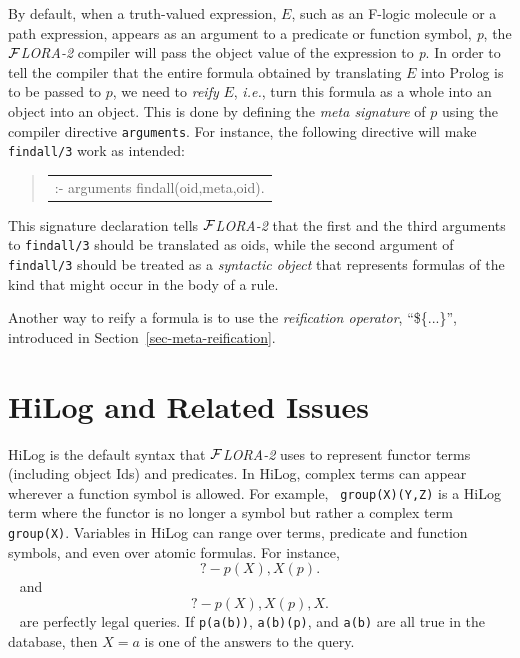 \documentclass[11pt]{article}
\newenvironment{qrules}{\begin{quote}\tt\begin{tabular}[t]{l}}%
{\end{tabular}\end{quote}}
\newcommand{\FLORA}{{\mbox{${\cal F}${\small\it LORA}\rm\emph{-2}}}\xspace}
\newcommand{\fl}{\mbox{F-logic}\xspace}
\begin{document}
%
By default, when a truth-valued expression, $E$, such as an \fl molecule or
a path expression, appears as an argument to a predicate or function
symbol, {\it p}, the \FLORA compiler will pass the object value of the
expression to {\it p}. In order to tell the compiler that the entire
formula obtained by translating $E$ into Prolog is to be passed to $p$, we
need to \emph{reify} $E$, {\it i.e.}, turn this formula as a whole into an
object into an object. This is done by defining
the \emph{meta signature} of $p$ using the compiler
directive {\tt arguments}.  For instance, the following directive will make
{\tt findall/3} work as intended:
\begin{qrules}
:- arguments findall(oid,meta,oid).
\end{qrules}
This signature declaration tells \FLORA that the first and the third
arguments to {\tt findall/3} should be translated as oids, while the second
argument of {\tt findall/3} should be treated as a {\em syntactic object\/}
that represents formulas of the kind that might occur in the body of a
rule.

Another way to reify a formula is to use the \emph{reification operator},
``\$\{...\}'', introduced in Section~\ref{sec-meta-reification}.


\section{HiLog and Related Issues} \label{sec:hilog}


%
HiLog \cite{hilog-jlp} is the default syntax that \FLORA uses to represent
functor terms (including object Ids) and predicates.  In HiLog, complex
terms can appear wherever a function symbol is allowed. For example, {\tt
  group(X)(Y,Z)} is a HiLog term where the functor is no longer a symbol
but rather a complex term {\tt group(X)}. Variables in HiLog can range over
terms, predicate and function symbols, and even over atomic formulas. For
instance,
{\tt
\begin{equation}
 ?- p(X), X(p).
\end{equation}
}
\noindent
and
{\tt
\begin{equation}\label{eq-hilog-notallowed}
 ?- p(X), X(p), X.  
\end{equation}
}
are perfectly legal queries. If {\tt p(a(b))}, {\tt a(b)(p)},
and {\tt a(b)} are all true in the database, then $X=a$ is one of the
answers to the query.
\end{document}
